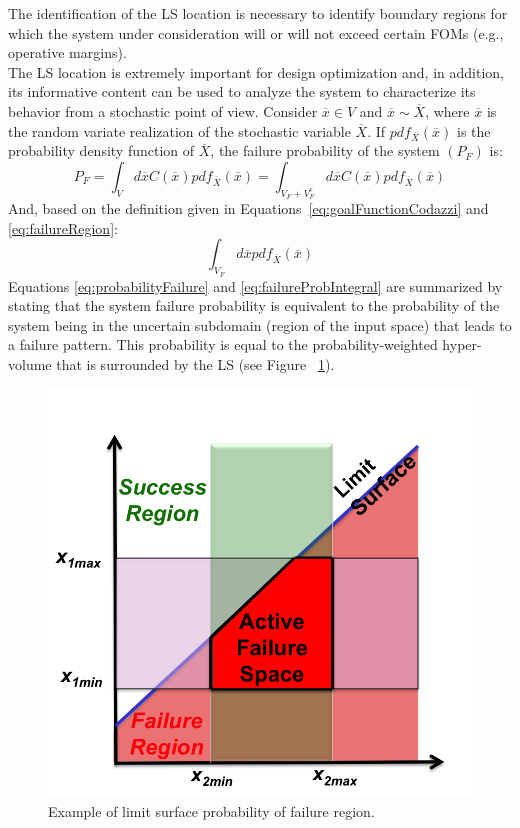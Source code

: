 The identification of the LS location is necessary to identify boundary regions for which the system under consideration will or will not exceed certain FOMs (e.g., operative margins).
\\The LS location is extremely important for design optimization and, in addition, its informative content can be used to analyze the system to characterize its behavior from a stochastic point of view. Consider $\overline{x} \in V$ and $\overline{x}\sim \overline{X}$,
where $\overline{x}$ is the random variate realization of the stochastic variable $\overline{X}$.
If $pdf_{\overline{X}}\left ( \overline{x} \right ) $ is the probability density function of $ \overline{X}$, the failure probability of the system $\left ( P_{F} \right )$ is:
\begin{equation}
\label{eq:probabilityFailure}
P_{F} = \int_{V}d\overline{x}C\left ( \overline{x} \right )pdf_{\overline{X}}\left ( \overline{x} \right ) = \int_{V_{F}+V_{F}^{c}}d\overline{x}C\left ( \overline{x} \right )pdf_{\overline{X}}\left ( \overline{x} \right )
\end{equation}
And, based on the definition given in Equations~\ref{eq:goalFunctionCodazzi} and \ref{eq:failureRegion}:
\begin{equation}
 \label{eq:failureProbIntegral}
 \int_{V_{F}}d\overline{x}pdf_{\overline{X}}\left ( \overline{x} \right )
 \end{equation}
Equations \ref{eq:probabilityFailure} and \ref{eq:failureProbIntegral} are summarized by stating that the system failure probability is
equivalent to the probability of the system being in the uncertain
subdomain (region of the input space) that leads to a failure pattern.
This probability is equal to the probability-weighted hyper-volume that is surrounded by the LS (see Figure ~\ref{fig:ProbabilityFailureLSExample}).
\begin{figure}[h!]
  \centering
  \includegraphics[width=1.0\textwidth]  {pics/ProbabilityFailureLSExample.png}
  \caption{Example of limit surface probability of failure region.}
  \label{fig:ProbabilityFailureLSExample}
\end{figure}
